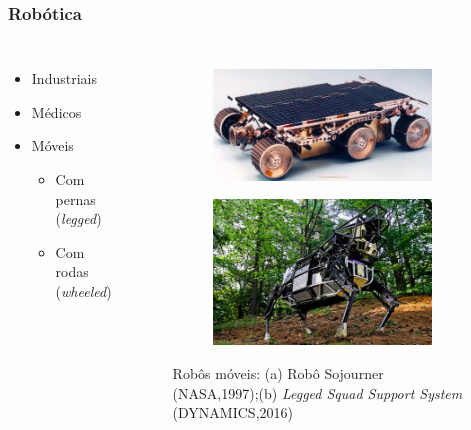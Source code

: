 \begin{frame}
\frametitle{Robótica}
\begin{columns}
	\begin{itemize}
	\item Industriais
	\item Médicos
	\item Móveis
		\begin{itemize}
		\item Com pernas (\textit{legged})
		\item Com rodas (\textit{wheeled})
		\end{itemize}
	\end{itemize}

	 \begin{figure}[h]
     \centering
     \captionsetup{width=\textwidth,font=footnotesize,textfont=bf}
     \begin{subfigure}[b]{0.5\textwidth}
 	\centering
         \includegraphics[width=\textwidth,height=\textheight,keepaspectratio]{Figuras/nasa.png}
         \caption{\centering \label{fig:Testen}}
     \end{subfigure}
     
     \begin{subfigure}[b]{0.5\textwidth}
 	\centering
         \includegraphics[width=\textwidth,height=5\textheight,keepaspectratio]{Figuras/Boston.png}
         \caption{\centering \label{fig:Testeo}}
     \end{subfigure}
	\caption{Robôs móveis: (a) Robô Sojourner (NASA,1997);(b) \textit{Legged Squad Support System} (DYNAMICS,2016)}
 \end{figure}
	

\end{columns}
\end{frame}
